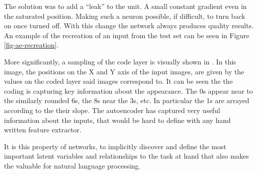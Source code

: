 \documentclass[12pt,parskip]{komatufte}
\begin{document}
The solution was to add a ``leak'' to the unit.
A small constant gradient even in the saturated position.
Making such a neuron possible, if difficult, to turn back on once turned off.
With this change the network always produces quality results.
An example of the recreation of an input from the test set can be seen in 
Figure \ref{fig-ae-recreation}. 



More significantly, a sampling of the code layer is visually shown in .
In this image, the positions on the X and Y axis of the input images, are given by the values on the coded layer said images correspond to.
It can be seen the the coding is capturing key information about the appearance.
The 0s appear near to the similarly rounded 6s,
the 8s near the 3s, etc.
In particular the 1s are arrayed according to the their slope.
The autoencoder has captured very useful information about the inputs, that would be hard to define with any hand written feature extractor.

It is this property of networks, to implicitly discover and define the most important latent variables and relationships to the task at hand that also makes the valuable for natural language processing.
\end{document}
